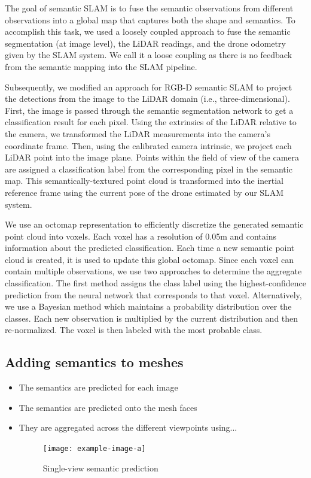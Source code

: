 The goal of semantic SLAM is to fuse the semantic observations from different observations into a global map that captures both the shape and semantics. To accomplish this task, we used a loosely coupled approach to fuse the semantic segmentation (at image level), the LiDAR readings, and the drone odometry given by the SLAM system. We call it a loose coupling as there is no feedback from the semantic mapping into the SLAM pipeline.

 
Subsequently, we modified an approach for RGB-D semantic SLAM \cite{semantic_slam} to project the detections from the image to the LiDAR domain (i.e., three-dimensional). First, the image is passed through the semantic segmentation network to get a classification result for each pixel. Using the extrinsics of the LiDAR relative to the camera, we transformed the LiDAR measurements into the camera's coordinate frame. Then, using the calibrated camera intrinsic, we project each LiDAR point into the image plane. Points within the field of view of the camera are assigned a classification label from the corresponding pixel in the semantic map. This semantically-textured point cloud is transformed into the inertial reference frame using the current pose of the drone estimated by our SLAM system. 

We use an octomap \cite{hornung13auro} representation to efficiently discretize the generated semantic point cloud into voxels. Each voxel has a resolution of 0.05m and contains information about the predicted classification. Each time a new semantic point cloud is created, it is used to update this global octomap. Since each voxel can contain multiple observations, we use two approaches to determine the aggregate classification. The first method assigns the class label using the highest-confidence prediction from the neural network that corresponds to that voxel. Alternatively, we use a Bayesian method which maintains a probability distribution over the classes. Each new observation is multiplied by the current distribution and then re-normalized. The voxel is then labeled with the most probable class.

\subsection{Adding semantics to meshes}
\begin{itemize}
    \item The semantics are predicted for each image
    \item The semantics are predicted onto the mesh faces
    \item They are aggregated across the different viewpoints using...

\begin{figure}
    \centering
    \texttt{[image: example-image-a]}
    \caption{Single-view semantic prediction}
    \label{fig:single-view-semantic-pred}
\end{figure}

\end{itemize}

